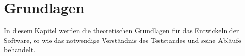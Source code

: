 
\newpage
\section{Grundlagen}
\label{sec:grundlagen}

In diesem Kapitel werden die theoretischen Grundlagen für das Entwickeln der Software,
so wie das notwendige Verständnis des Teststandes und seine Abläufe behandelt.











